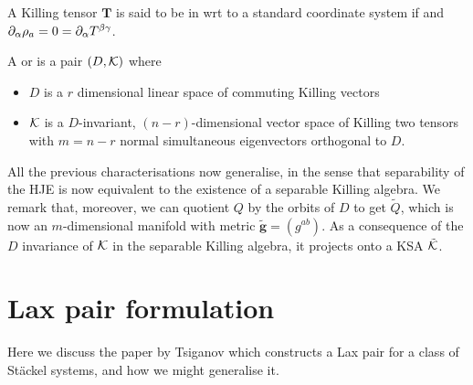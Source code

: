 \documentclass{article}
\begin{document}
\begin{definition}
A Killing tensor $\bm{T}$ is said to be in  wrt to a standard coordinate system if  
and $\partial_\alpha \rho_a = 0 = \partial_\alpha T^{\beta \gamma}$. 
\end{definition}

\begin{definition}
A  or  is a pair $(D,\mathcal{K})$ where 
\begin{itemize}
    \item $D$ is a $r$ dimensional linear space of commuting Killing vectors 
    \item $\mathcal{K}$ is a $D$-invariant, $(n-r)$-dimensional vector space of Killing two tensors with $m=n-r$ normal simultaneous eigenvectors orthogonal to $D$. 
\end{itemize}
\end{definition}

All the previous characterisations now generalise, in the sense that separability of the HJE is now equivalent to the existence of a separable Killing algebra. We remark that, moreover, we can quotient $Q$ by the orbits of $D$ to get $\tilde{Q}$, which is now an $m$-dimensional manifold with metric $\tilde{\bm{g}} = (g^{ab})$. As a consequence of the $D$ invariance of $\mathcal{K}$ in the separable Killing algebra, it projects onto a KSA $\tilde{\mathcal{K}}$. 

\section{Lax pair formulation}
Here we discuss the paper by Tsiganov \cite{Tsiganov1999} which constructs a Lax pair for a class of St\"ackel systems, and how we might generalise it. 





\end{document}
